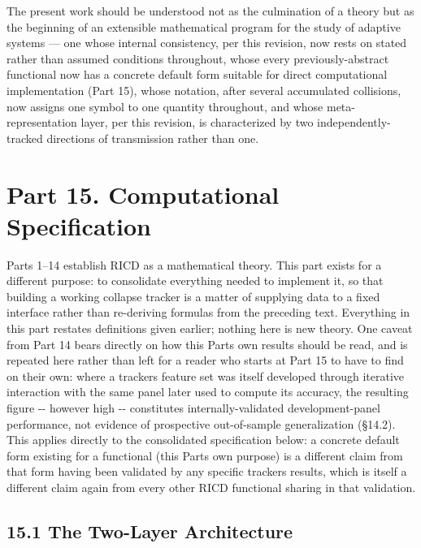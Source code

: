 \documentclass[
]{article}
\begin{document}
The present work should be understood not as the culmination of a theory
but as the beginning of an extensible mathematical program for the study
of adaptive systems --- one whose internal consistency, per this
revision, now rests on stated rather than assumed conditions throughout,
whose every previously-abstract functional now has a concrete default
form suitable for direct computational implementation (Part 15), whose
notation, after several accumulated collisions, now assigns one symbol
to one quantity throughout, and whose meta-representation layer, per
this revision, is characterized by two independently-tracked directions
of transmission rather than one.

\hypertarget{part-15.-computational-specification}{%
\section{Part 15. Computational
Specification}\label{part-15.-computational-specification}}

Parts 1--14 establish RICD as a mathematical theory. This part exists
for a different purpose: to consolidate everything needed to implement
it, so that building a working collapse tracker is a matter of supplying
data to a fixed interface rather than re-deriving formulas from the
preceding text. Everything in this part restates definitions given
earlier; nothing here is new theory. One caveat from Part 14 bears
directly on how this Part\textquotesingle s own results should be read,
and is repeated here rather than left for a reader who starts at Part 15
to have to find on their own: where a tracker\textquotesingle s feature
set was itself developed through iterative interaction with the same
panel later used to compute its accuracy, the resulting figure -\/-
however high -\/- constitutes internally-validated development-panel
performance, not evidence of prospective out-of-sample generalization
(§14.2). This applies directly to the consolidated specification below:
a concrete default form existing for a functional (this
Part\textquotesingle s own purpose) is a different claim from that form
having been validated by any specific tracker\textquotesingle s results,
which is itself a different claim again from every other RICD functional
sharing in that validation.

\hypertarget{the-two-layer-architecture}{%
\subsection{15.1 The Two-Layer
Architecture}\label{the-two-layer-architecture}}
\end{document}

